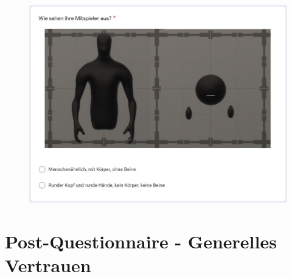\documentclass[a4paper,11pt]{article}%
\renewcommand{\\}{\vspace*{0.5\baselineskip} \newline}
\begin{document}
	\begin{figure}[H]
		\begin{footnotesize}
			\includegraphics[width=\textwidth]{Abbildungen/Fragebogen/Post-Questionnaire/PQM1}
		\end{footnotesize}
	\end{figure}	

\newpage

\section{Post-Questionnaire - Generelles Vertrauen}
\label{Post-Questionnaire - Generelles Vertrauen}
\end{document}
